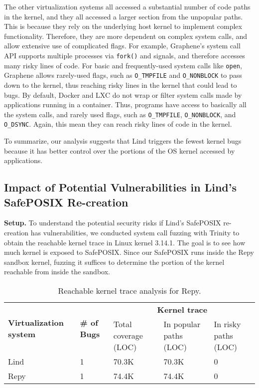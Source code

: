 {{{The other virtualization systems all accessed a substantial number of code
paths in the kernel, and they all accessed a larger section from the unpopular
paths. This is because they rely on the underlying host kernel to implement
complex functionality. Therefore, they are more dependent on complex system
calls, and allow extensive use of complicated flags.  For example, Graphene's
system call API supports multiple processes via \texttt{fork()} and signals,
and therefore accesses many risky lines of code. 
For basic and frequently-used system calls like \texttt{open},
Graphene allows rarely-used flags, such as \texttt{O\_TMPFILE} and \texttt{O\_NONBLOCK}
to pass down to the kernel, thus reaching risky lines in the kernel that could lead to bugs.
By default, Docker and LXC do not wrap or filter system calls made by applications running in a container.
Thus, programs have access to basically all the system calls, and rarely used flags, such as \texttt{O\_TMPFILE},
\texttt{O\_NONBLOCK}, and \texttt{O\_DSYNC}. Again, this mean they can reach risky lines of code in the kernel.

To summarize, our analysis suggests that Lind triggers the fewest kernel bugs because
it has better control over the portions of the OS kernel accessed by applications.

\subsection{Impact of Potential Vulnerabilities in Lind's SafePOSIX Re-creation}
\label{Reachable-Kernel-Trace-Analysis-for-Repy-Sandbox}


\noindent
\textbf{Setup.}
To understand the potential security risks if Lind's SafePOSIX re-creation
has vulnerabilities, we conducted system call fuzzing with Trinity
to obtain the reachable kernel trace in Linux kernel 3.14.1.
The goal is to see how much kernel is exposed to
SafePOSIX. Since our SafePOSIX runs inside the Repy sandbox kernel,
fuzzing it suffices to determine the portion of the kernel reachable from
inside the sandbox.

\begin{table}
\centering
\scriptsize
\begin{tabular}{|l|l|l|l|l|}
  \hline
  \multirow{3}{1.5cm}{\bf Virtualization system} & \multirow{3}{0.5cm}{\bf \# of Bugs} & \multicolumn{3}{c|}{\bf Kernel trace} \\ \cline{3-5}
  & & \multirow{2}{1.5cm}{Total coverage (LOC)} & \multirow{2}{1.3cm}{In popular paths (LOC)} & \multirow{2}{1.3cm}{In risky paths (LOC)}  \\
  & & & & \\  \hline
  Lind & 1 & 70.3K & 70.3K & 0 \\
  \hline
  Repy & 1 & 74.4K & 74.4K & 0 \\
  \hline
\end{tabular}\caption{\small Reachable kernel trace analysis for Repy.}
\label{table:trace-Repy}
\end{table}

}}}
